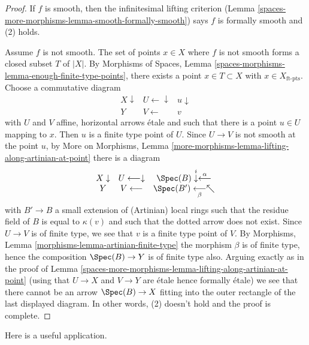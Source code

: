 \begin{proof}
If $f$ is smooth, then the infinitesimal lifting criterion
(Lemma \ref{spaces-more-morphisms-lemma-smooth-formally-smooth}) says
$f$ is formally smooth and (2) holds.

\medskip\noindent
Assume $f$ is not smooth. The set of points $x \in X$ where $f$ is not smooth
forms a closed subset $T$ of $|X|$. By
Morphisms of Spaces, Lemma
\ref{spaces-morphisms-lemma-enough-finite-type-points}, there exists
a point $x \in T \subset X$ with $x \in X_{\text{ft-pts}}$. Choose a
commutative diagram
$$
\begin{array}{ccc}X \downarrow & U \longleftarrow\downarrow & u \downarrow \\ Y & V \longleftarrow & v\end{array}
$$
with $U$ and $V$ affine, horizontal arrows \'etale and
such that there is a point $u \in U$ mapping to $x$. Then $u$
is a finite type point of $U$. Since $U \to V$ is not smooth at
the point $u$, by
More on Morphisms,
Lemma \ref{more-morphisms-lemma-lifting-along-artinian-at-point}
there is a diagram
$$
\begin{array}{ccc}X \downarrow & U \longleftarrow\downarrow & \Spec(B) \overset{i}{\downarrow}\overset{\alpha}{\longleftarrow} \\ Y & V \longleftarrow & \Spec(B') \underset{\beta}{\longleftarrow}\nwarrow\end{array}
$$
with $B' \to B$ a small extension of (Artinian) local rings
such that the residue field of $B$ is equal to $\kappa(v)$ and such
that the dotted arrow does not exist. Since $U \to V$ is
of finite type, we see that $v$ is a finite type point of $V$. By
Morphisms, Lemma \ref{morphisms-lemma-artinian-finite-type}
the morphism $\beta$ is of finite type, hence the composition
$\Spec(B) \to Y$ is of finite type also.
Arguing exactly as in the proof of
Lemma \ref{spaces-more-morphisms-lemma-lifting-along-artinian-at-point}
(using that $U \to X$ and $V \to Y$ are \'etale hence
formally \'etale)
we see that there cannot be an arrow $\Spec(B) \to X$
fitting into the outer rectangle of the last displayed diagram.
In other words, (2) doesn't hold and the proof is complete.
\end{proof}

Here is a useful application.

